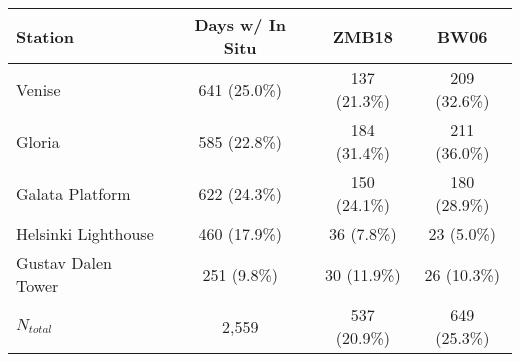 \documentclass[preview]{standalone}
\begin{document}
\begin{table}
\begin{tabular}{lccc}\hline
Station 				& Days w/ In Situ 	& ZMB18 	& BW06	\\\hline
Venise 					& 641 (25.0\%) 	& 137 (21.3\%)	& 209 (32.6\%)	\\
Gloria 					& 585 (22.8\%)	& 184 (31.4\%)	& 211 (36.0\%)	\\
Galata Platform 		& 622 (24.3\%)	& 150 (24.1\%)	& 180 (28.9\%)	\\
Helsinki Lighthouse 	& 460 (17.9\%)	& 36 (7.8\%)		& 23 (5.0\%)	\\
Gustav Dalen Tower 		& 251 (9.8\%)	& 30 (11.9\%)		& 26 (10.3\%)	\\\hline
$N_{total}$ 			& 2,559 & 537 (20.9\%) & 649 (25.3\%) 	\\

\end{tabular}
\end{table}
\end{document}
